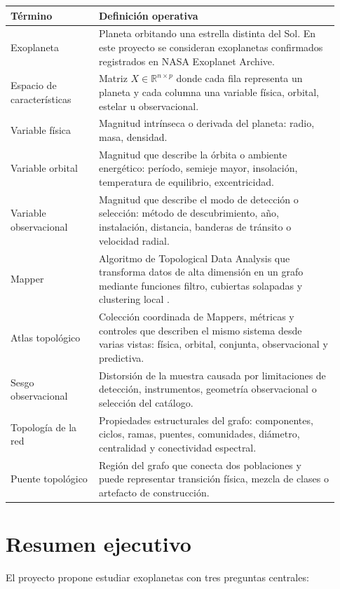 \documentclass[11pt,letterpaper]{article}
\newcommand{\R}{\mathbb{R}}
\begin{document}
\begin{longtable}{p{0.25\linewidth}p{0.68\linewidth}}
\toprule
\textbf{Término} & \textbf{Definición operativa} \\
\midrule
\endhead
Exoplaneta & Planeta orbitando una estrella distinta del Sol. En este proyecto se consideran exoplanetas confirmados registrados en NASA Exoplanet Archive. \\
Espacio de características & Matriz $X\in\R^{n\times p}$ donde cada fila representa un planeta y cada columna una variable física, orbital, estelar u observacional. \\
Variable física & Magnitud intrínseca o derivada del planeta: radio, masa, densidad. \\
Variable orbital & Magnitud que describe la órbita o ambiente energético: período, semieje mayor, insolación, temperatura de equilibrio, excentricidad. \\
Variable observacional & Magnitud que describe el modo de detección o selección: método de descubrimiento, año, instalación, distancia, banderas de tránsito o velocidad radial. \\
Mapper & Algoritmo de Topological Data Analysis que transforma datos de alta dimensión en un grafo mediante funciones filtro, cubiertas solapadas y clustering local \cite{singh2007mapper}. \\
Atlas topológico & Colección coordinada de Mappers, métricas y controles que describen el mismo sistema desde varias vistas: física, orbital, conjunta, observacional y predictiva. \\
Sesgo observacional & Distorsión de la muestra causada por limitaciones de detección, instrumentos, geometría observacional o selección del catálogo. \\
Topología de la red & Propiedades estructurales del grafo: componentes, ciclos, ramas, puentes, comunidades, diámetro, centralidad y conectividad espectral. \\
Puente topológico & Región del grafo que conecta dos poblaciones y puede representar transición física, mezcla de clases o artefacto de construcción. \\
\bottomrule
\end{longtable}

\section{Resumen ejecutivo}

El proyecto propone estudiar exoplanetas con tres preguntas centrales:
\end{document}
